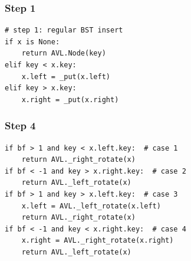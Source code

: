 \documentclass[aspectratio=169, 14pt]{beamer}
\begin{document}
\begin{frame}[fragile]
    \frametitle{Step 1}
    \begin{verbatim}
# step 1: regular BST insert
if x is None:
    return AVL.Node(key)
elif key < x.key:
    x.left = _put(x.left)
elif key > x.key:
    x.right = _put(x.right)
    \end{verbatim}

\end{frame}

\begin{frame}[fragile]
    \frametitle{Step 4}
\begin{verbatim}
if bf > 1 and key < x.left.key:  # case 1
    return AVL._right_rotate(x)
if bf < -1 and key > x.right.key:  # case 2
    return AVL._left_rotate(x)
if bf > 1 and key > x.left.key:  # case 3
    x.left = AVL._left_rotate(x.left)
    return AVL._right_rotate(x)
if bf < -1 and key < x.right.key:  # case 4
    x.right = AVL._right_rotate(x.right)
    return AVL._left_rotate(x)    
\end{verbatim}
    

\end{frame}
\end{document}
